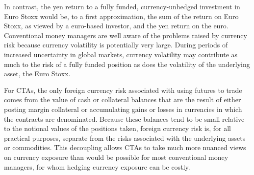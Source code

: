 \documentclass[11pt]{article}
\begin{document}
In contrast, the yen return to a fully funded, currency-unhedged investment in Euro Stoxx would be, to a first approximation, the sum of the return on Euro Stoxx, as viewed by a euro-based investor, and the yen return on the euro. Conventional money managers are well aware of the problems raised by currency risk because currency volatility is potentially very large. During periods of increased uncertainty in global markets, currency volatility may contribute as much to the risk of a fully funded position as does the volatility of the underlying asset, the Euro Stoxx.

For CTAs, the only foreign currency risk associated with using futures to trade comes from the value of cash or collateral balances that are the result of either posting margin collateral or accumulating gains or losses in currencies in which the contracts are denominated. Because these balances tend to be small relative to the notional values of the positions taken, foreign currency risk is, for all practical purposes, separate from the risks associated with the underlying assets or commodities. This decoupling allows CTAs to take much more nuanced views on currency exposure than would be possible for most conventional money managers, for whom hedging currency exposure can be costly.
\end{document}
